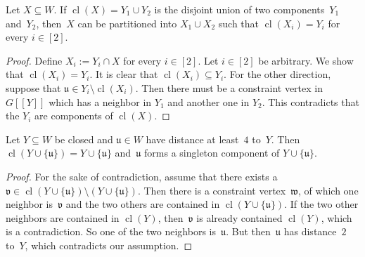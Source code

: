 \documentclass[]{lmcs}
\newcommand{\set}[1]{\lbrace #1 \rbrace}
\newcommand{\bVertA}{\mathfrak{u}}
\newcommand{\bVertB}{\mathfrak{v}}
\newcommand{\bVertC}{\mathfrak{w}}
\newcommand{\feetb}{W}
\newcommand{\footbset}{X}
\newcommand{\footbsetA}{X}
\newcommand{\footbsetB}{Y}
\newcommand{\closure}[1]{\operatorname{cl}(#1)}
\newcommand{\footinduced}[2]{#1[[#2]]}
\begin{document}
\begin{lem}
	\label{lem:closure-components}
	Let $\footbsetA \subseteq \feetb$.
	If $\closure{\footbset} = \footbsetB_1 \cup \footbsetB_2$
	is the disjoint union of two components~$\footbsetB_1$ and~$\footbsetB_2$,
	then~$\footbsetA$ can be partitioned into $\footbsetA_1 \cup \footbsetA_2$
	such that $\closure{\footbsetA_i} = \footbsetB_i$ for every $i \in [2]$.
\end{lem}
\begin{proof}
	Define $\footbsetA_i := \footbsetB_i \cap \footbsetA$ for every $i \in [2]$.
	Let $i \in [2]$ be arbitrary. We show that $\closure{\footbsetA_i} = \footbsetB_i$.
	It is clear that $\closure{\footbsetA_i} \subseteq \footbsetB_i$.
	For the other direction, suppose that $\bVertA \in \footbsetB_i \setminus \closure{\footbsetA_i}$.
	Then there must be a constraint vertex in $\footinduced{G}{\footbsetB}$
	which has a neighbor in $\footbsetB_1$ and another one in $\footbsetB_2$.
	This contradicts that the $\footbsetB_i$ are components of $\closure{\footbset}$.
\end{proof}

\begin{lem}
	\label{lem:closure-singleton-component}
	Let $\footbsetB\subseteq \feetb$ be closed and
	$\bVertA \in \feetb$ have distance at least~$4$ to~$\footbsetB$.
	Then $\closure{\footbsetB \cup \set{\bVertA}} = \footbsetB \cup \set{\bVertA}$
	and~$\bVertA$ forms a singleton component of $\footbsetB \cup \set{\bVertA}$.
\end{lem}
\begin{proof}
	For the sake of contradiction,
	assume that there exists a $\bVertB \in \closure{\footbsetB \cup \set{\bVertA}}  \setminus (\footbsetB \cup \set{\bVertA})$.
	Then there is a constraint vertex~$\bVertC$,
	of which one neighbor is~$\bVertB$
	and the two others are contained in $\closure{\footbsetB \cup \set{\bVertA}}$.
	If the two other neighbors are contained in $\closure{\footbsetB}$,
	then~$\bVertB$ is already contained $\closure{\footbsetB}$,
	which is a contradiction.
	So one of the two neighbors is~$\bVertA$.
	But then~$\bVertA$ has distance~$2$ to~$\footbsetB$,
	which contradicts our assumption.
\end{proof}
\end{document}
